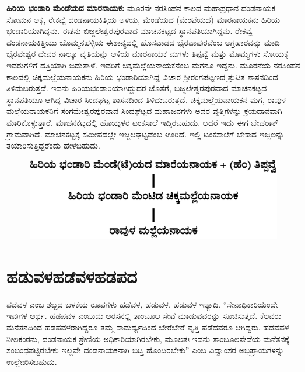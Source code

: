 \textbf{ಹಿರಿಯ ಭಂಡಾರಿ ಮೆಂಡೆಯದ ಮಾರನಾಯಕ:} ಮೂರನೇ ನರಸಿಂಹನ ಕಾಲದ ಮಹಾಪ್ರಧಾನ ದಂಡನಾಯಕ ಸೋಮನ ಅಕ್ಕ, ರೇಕವ್ವೆ ದಂಡನಾಯಕಿತ್ತಿಯ ಅಳಿಯ, ಮೆಂಡೆಯದ (ಮೆಂಟೆಯದ) ಮಾರನಾಯಕನು ಹಿರಿಯ ಭಂಡಾರಿ\-ಯಾಗಿದ್ದನು. ಈತನು ಬಿಜ್ಜಲೇಶ್ವರಪುರವಾದ ಮಾಚನಕಟ್ಟದ ಸ್ಥಾನಪತಿಯಾಗಿದ್ದನು. ರೇಕವ್ವೆ ದಂಡನಾಯಕಿತ್ತಿಯು ಬೊಮ್ಮನಹಳ್ಳಿಯ ಈಶಾನ್ಯದಲ್ಲಿ ಹೊಸವಾಡದ ಭೈರವಾಪುರವೆಂಬ ಅಗ್ರಹಾರವನ್ನು ಮಾಡಿ ಭೈರವೇಶ್ವರ ದೇವರ ನಾಲ್ಕೂ ವೃತಿಯನ್ನು ಅಳಿಯ ಮಾರನಾಯಕ ಮಗಳು ತಿಪ್ಪವ್ವೆ ಮತ್ತು ಮೊಮ್ಮಗಳು ಸೋಯಕ್ಕ ಇವರುಗಳಿಗೆ ದತ್ತಿಯಾಗಿ ಬಿಡುತ್ತಾಳೆ. ಇವರಿಗೆ ಚಿಕ್ಕಮಲ್ಲೆಯನಾಯಕನೆಂಬ ಮಗನೂ ಇದ್ದನು. ಮೂರನೆಯ ನರಸಿಂಹನ ಕಾಲದಲ್ಲಿ ಚಿಕ್ಕಮಲ್ಲೆಯನಾಯಕನು ಹಿರಿಯ ಭಂಡಾರಿಯಾಗಿದ್ದ ವಿಚಾರ ಶ‍್ರೀರಂಗಪಟ್ಟಣದ ತ್ರುಟಿತ ಶಾಸನದಿಂದ ತಿಳಿದುಬರುತ್ತದೆ. ಇವನು ಹಿರಿಯಭಂಡಾರಿಯಾಗಿ\-ದ್ದುದರ ಜೊತೆಗೆ, ಬಿಜ್ಜಲೇಶ್ವರಪುರವಾದ ಮಾಚನಕಟ್ಟದ ಸ್ಥಾನಪತಿಯೂ ಆಗಿದ್ದ ವಿಚಾರ ಸಿಂದಘಟ್ಟ ಶಾಸನದಿಂದ ತಿಳಿದು\-ಬರುತ್ತದೆ. ಚಿಕ್ಕಮಲ್ಲೆಯನಾಯಕನ ಮಗ, ರಾವುಳ ಮಲ್ಲೆಯನಾಯಕನಿಗೆ ಸಂಗಮೇಶ್ವರಪುರವಾದ ಸಿಂದಘಟ್ಟದ ಮಹಾಜನಗಳು ಅವರ ವೃತ್ತಿಗಳನ್ನು ಕ್ರಯದಾನವಾಗಿ ಮಾರಿಕೊಳ್ಳುತ್ತಾರೆ. ಮಾಚನಕಟ್ಟದಲ್ಲಿ ಹೊಯ್ಸಳರ ಟಂಕಸಾಲೆ ಇದ್ದಿರಬಹುದು. ಆದರೆ ಇದು ಈಗ ಬೇಚರಾಕ್​ ಗ್ರಾಮವಾಗಿದೆ. ಮಾಚನಕಟ್ಟಕ್ಕೆ ಸಮೀಪದಲ್ಲೇ ಇಜ್ಜಲಘಟ್ಟವೆಂಬ ಊರಿದೆ. ಇಲ್ಲಿ ಟಂಕಸಾಲೆಗೆ ಬೇಕಾದ ಇಜ್ಜಲನ್ನು ತಯಾರಿಸುತ್ತಿದ್ದರೆಂದು ಹೇಳಬಹುದು.

\begin{figure}[H]
\includegraphics[scale=1.2]{images/chap3/chap3fig31.jpeg}
\end{figure}


\section{ಹಡುವಳ\enginline{-}ಹಡೆವಳ\enginline{-}ಹಡಪದ}

ಪಡೆವಳ ಎಂಬ ಶಬ್ದದ ಬಳಕೆಯ ರೂಪಗಳು ಹಡೆವಳ, ಹಡುವಳ, ಹಡುವಳ ಇತ್ಯಾದಿ. “ಸೇನಾಧಿಕಾರಿಯೆಂದೇ ಇವುಗಳ ಅರ್ಥ. ಹಡಪವಳ ಎಂಬುದು ಅರಸನಲ್ಲಿ ತಾಂಬೂಲ ಸೇವೆ ಮಾಡುವವರನ್ನು ಸೂಚಿಸುತ್ತದೆ. ಕೆಲವರು ಮನೆತನದಿಂದ ಹಡಪವಳರಾಗಿದ್ದರೂ ತಮ್ಮ ಸಾಮರ್ಥ್ಯದಿಂದ ಬೇರೆಬೇರೆ ವೃತ್ತಿ ಪಡೆದವರೂ ಆಗಿದ್ದರು. ಹಡವಪಳ ನೀಲಕಂಠನು, ದಂಡನಾಯಕ ಶ್ರೇಣಿಯ ಅಧಿಕಾರಿಯಾಗಿರಬೇಕು, ಮೂಲತಃ ಇವನು ತಾಂಬೂಲಸೇವೆಯ ಮನೆತನಕ್ಕೆ ಸಂಬಂಧಪಟ್ಟಿರಬೇಕು ಇಲ್ಲವೇ ದಂಡನಾಯಕನಾಗಿ ಬಡ್ತಿ ಹೊಂದಿರಬೇಕು” ಎಂಬ ವಿದ್ವಾಂಸರ ಅಭಿಪ್ರಾಯಗಳನ್ನು ಉಲ್ಲೇಖಿಸಬಹುದು.

